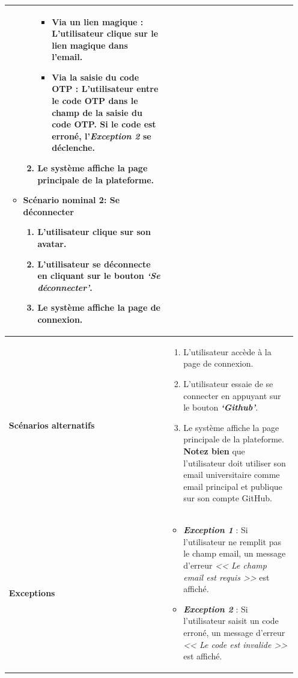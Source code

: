 \begin{itemize}[itemsep=1pt, parsep=1pt]
\begin{longtable}{|>{\RaggedRight\arraybackslash}p{4cm}|>{\RaggedRight\arraybackslash}p{12cm}|}
\begin{itemize}[label=]
\begin{enumerate}
                \begin{itemize}[label=--]
                    \item \textbf{Via un lien magique :} L’utilisateur clique sur le lien magique dans l’email.
                    \item \textbf{Via la saisie du code OTP :} L’utilisateur entre le code OTP dans le champ de la saisie du code OTP. Si le code est erroné, l'\textbf{\textit{Exception 2}} se déclenche.
                \end{itemize}
                \item Le système affiche la page principale de la plateforme.
            \end{enumerate}
            \item \textbf{Scénario nominal 2: Se déconnecter}
            \begin{enumerate}
                \item L’utilisateur clique sur son avatar.
                \item L’utilisateur se déconnecte en cliquant sur le bouton \textbf{\textit{‘Se déconnecter’}}.
                \item Le système affiche la page de connexion.
            \end{enumerate}
        \end{itemize} \\
        \hline
        \textbf{Scénarios alternatifs} & 
        \begin{enumerate}
            \item L’utilisateur accède à la page de connexion.
            \item L’utilisateur essaie de se connecter en appuyant sur le bouton \textbf{\textit{‘Github’}}. 
            \item Le système affiche la page principale de la plateforme. \newline \textbf{Notez bien} que l'utilisateur doit utiliser son email universitaire comme email principal et publique sur son compte GitHub.
        \end{enumerate} \\
        \hline
        \textbf{Exceptions} & 
        \begin{itemize}[label=--]
            \item \textbf{\textit{Exception 1}} : Si l’utilisateur ne remplit pas le champ email, un message d’erreur \textit{<< Le champ email est requis >>} est affiché.
            \item \textbf{\textit{Exception 2}} : Si l’utilisateur saisit un code erroné, un message d’erreur \textit{<< Le code est invalide >>} est affiché.
        \end{itemize} \\
        \hline
    \end{longtable}
    \label{tab:Description textuelle du cas d’utilisation « s’identifiere »}


\end{itemize}
